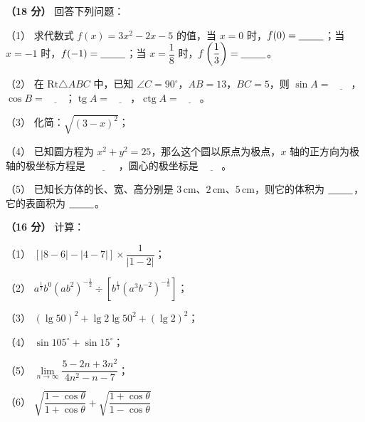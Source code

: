 \begin{question}
\textbf{（18 分）} 回答下列问题：

（1） 求代数式 $f(x)=3x^2-2x-5$ 的值，当 $x=0$ 时，$f(0)=\underline{\hspace{2.5em}}$；当 $x=-1$ 时，$f(-1)=\underline{\hspace{2.5em}}$；当 $x=\dfrac18$ 时，$f\left(\dfrac13\right)=\underline{\hspace{2.5em}}$。

（2） 在 $\mathrm{Rt}\triangle ABC$ 中，已知 $\angle C=90^\circ$，$AB=13$，$BC=5$，则 $\sin A=\underline{\hspace{2em}}$，$\cos B=\underline{\hspace{2em}}$；$\operatorname{tg}A=\underline{\hspace{2em}}$，$\operatorname{ctg}A=\underline{\hspace{2em}}$。

（3） 化简：$\sqrt{(3-x)^2}$；

（4） 已知圆方程为 $x^2+y^2=25$，那么这个圆以原点为极点，$x$ 轴的正方向为极轴的极坐标方程是 $\underline{\hspace{3em}}$，圆心的极坐标是 $\underline{\hspace{2em}}$。

（5） 已知长方体的长、宽、高分别是 $3\,\mathrm{cm}$、$2\,\mathrm{cm}$、$5\,\mathrm{cm}$，则它的体积为 $\underline{\hspace{2.5em}}$，它的表面积为 $\underline{\hspace{2.5em}}$。

\end{question}
\begin{question}
\textbf{（16 分）} 计算：

（1） $\left[\left|8-6\right|-\left|4-7\right|\right]\times\dfrac{1}{\left|1-2\right|}$；

（2） $a^{\frac12}b^0\left(ab^2\right)^{-\frac12}\div\left[b^{\frac13}\left(a^3b^{-2}\right)^{-\frac13}\right]$；

（3） $\left(\lg 50\right)^2+\lg 2\lg 50^2+\left(\lg 2\right)^2$；

（4） $\sin 105^\circ+\sin 15^\circ$；

（5） $\lim\limits_{n\to\infty}\dfrac{5-2n+3n^2}{4n^2-n-7}$；

（6） $\sqrt{\dfrac{1-\cos\theta}{1+\cos\theta}}+\sqrt{\dfrac{1+\cos\theta}{1-\cos\theta}}$

\end{question}
